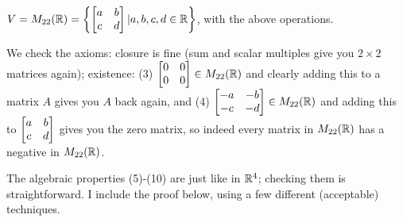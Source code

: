 \begin{myexample} $\displaystyle V = M_{22}(\mathbb{R}) = \left\{ \left[ \begin{matrix} a & b \\ c & d \end{matrix} \right] | a,b,c,d \in \mathbb{R} \right\}$, with the above operations.

We check the axioms:  closure is fine (sum and scalar multiples give you 
$2\times 2$ matrices again); existence: (3)  $\left[ \begin{matrix} 0&0 \\ 0 & 0 \end{matrix} \right] \in M_{2 2}(\mathbb{R})$ and clearly adding this to a matrix $A$ gives you $A$ back again,
and (4) $\left[ \begin{matrix} -a&-b\\-c&-d \end{matrix} \right] \in M_{22}(\mathbb{R})$ and adding this to
$\left[ \begin{matrix} a&b\\c&d \end{matrix} \right]$ gives you the zero matrix, so indeed every matrix in
$M_{22}(\mathbb{R})$ has a negative in $M_{22}(\mathbb{R})$.  

The algebraic properties (5)-(10) are just like
in $\mathbb{R}^4$; checking them is straightforward.  I include the
proof below, using a few different (acceptable) techniques.  


\end{myexample}
